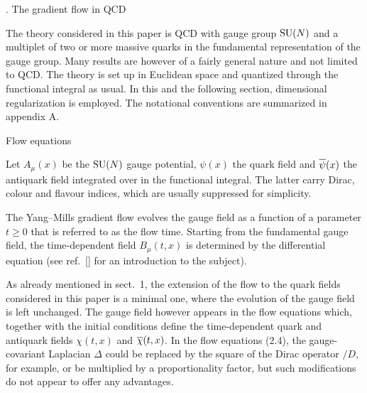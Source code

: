 
. The gradient flow in QCD

The theory considered in this paper is QCD with gauge group ${\rm SU}(N)$ and a 
multiplet of two or more massive quarks in the 
fundamental representation of the gauge group. 
Many results are however of a fairly general nature
and not limited to QCD. The theory is set up in Euclidean
space and quantized through the functional integral as usual.
In this and the following section, dimensional regularization 
is employed.
The notational conventions are summarized
in appendix A.


 Flow equations

Let $A_{\mu}(x)$ be the ${\rm SU}(N)$ gauge potential,
$\psi(x)$ the quark field and $\overline{\psi}(x)$ the antiquark field
integrated over in the functional integral. The latter 
carry Dirac, colour and flavour indices, which are usually suppressed 
for simplicity. 

The Yang--Mills gradient flow evolves the gauge field as a function 
of a parameter $t\geq0$ that is referred to as the flow time.
Starting from the fundamental gauge field,
the time-dependent field $B_{\mu}(t,x)$
is determined by the differential equation
(see ref.~[\cite{WilsonFlow}] for an introduction to the subject).

As already mentioned in sect.~1, the extension of the flow to the
quark fields con\-sidered in this paper is a minimal one, where
the evolution of the gauge field is left unchanged.
The gauge field however appears in the flow 
equations\kern1pt
which, together with the initial conditions
define the time-dependent quark and antiquark 
fields $\chi(t,x)$ and $\overline{\chi}(t,x)$.
In the flow equations (2.4), 
the gauge-covariant Laplacian $\Delta$ 
could be replaced by the square 
of the Dirac operator $\slash{D}$, for example, 
or be multiplied by a proportionality factor,
but such modifications
do not appear to offer any advantages.

